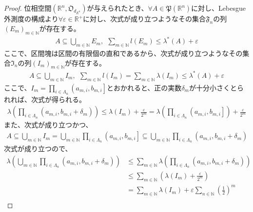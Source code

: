 \documentclass[dvipdfmx]{jsarticle}
\begin{document}
\begin{proof}
位相空間$\left( \mathbb{R}^{n},\mathfrak{O}_{d_{E^{n}}} \right)$が与えられたとき、$\forall A \in \mathfrak{P}\left( \mathbb{R}^{n} \right)$に対し、Lebesgue外測度の構成より$\forall\varepsilon \in \mathbb{R}^{+}$に対し、次式が成り立つようなその集合$\mathfrak{F}_{n}$の列$\left( E_{m} \right)_{m \in \mathbb{N}}$が存在する。
\begin{align*}
A \subseteq \bigcup_{m \in \mathbb{N}} E_{m},\ \ \sum_{m \in \mathbb{N}} {l\left( E_{m} \right)} \leq \lambda^{*}(A) + \varepsilon
\end{align*}
ここで、区間塊は区間の有限個の直和であるから、次式が成り立つようなその集合$\mathfrak{I}_{n}$の列$\left( I_{m} \right)_{m \in \mathbb{N}}$が存在する。
\begin{align*}
A \subseteq \bigcup_{m \in \mathbb{N}} I_{m},\ \ \sum_{m \in \mathbb{N}} {l\left( I_{m} \right)} = \sum_{m \in \mathbb{N}} {\lambda\left( I_{m} \right)} \leq \lambda^{*}(A) + \varepsilon
\end{align*}
ここで、$I_{m} = \prod_{i \in \varLambda_{n}} \left( a_{m,i},b_{m,i} \right]$とおかれると、正の実数$\delta_{m}$が十分小さくとられれば、次式が得られる。
\begin{align*}
\lambda\left( \prod_{i \in \varLambda_{n}} \left( a_{m,i},b_{m,i} + \delta_{m} \right) \right) \leq \lambda\left( I_{m} \right) + \frac{\varepsilon}{2^{m}} = \lambda\left( \prod_{i \in \varLambda_{n}} \left( a_{m,i},b_{m,i} \right] \right) + \frac{\varepsilon}{2^{m}}
\end{align*}
また、次式が成り立つかつ、
\begin{align*}
A \subseteq \bigcup_{m \in \mathbb{N}} I_{m} = \bigcup_{m \in \mathbb{N}} {\prod_{i \in \varLambda_{n}} \left( a_{m,i},b_{m,i} \right]} \subseteq \bigcup_{m \in \mathbb{N}} {\prod_{i \in \varLambda_{n}} \left( a_{m,i},b_{m,i} + \delta_{m} \right)}
\end{align*}
次式が成り立つので、
\begin{align*}
\lambda\left( \bigcup_{m \in \mathbb{N}} {\prod_{i \in \varLambda_{n}} \left( a_{m,i},b_{m,i} + \delta_{m} \right)} \right) &\leq \sum_{m \in \mathbb{N}} {\lambda\left( \prod_{i \in \varLambda_{n}} \left( a_{m,i},b_{m,i} + \delta_{m} \right) \right)}\\
&\leq \sum_{m \in \mathbb{N}} \left( \lambda\left( I_{m} \right) + \frac{\varepsilon}{2^{m}} \right)\\
&= \sum_{m \in \mathbb{N}} {\lambda\left( I_{m} \right)} + \varepsilon\sum_{n \in \mathbb{N}} \left( \frac{1}{2} \right)^{m}\\

\end{align*}
\end{proof}
\end{document}
